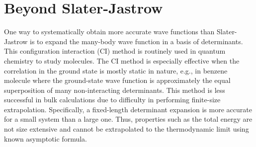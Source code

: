 \begin{comment}
For the gravitational interaction $v(r)=Gm_1m_2/r^2$, eq.~(\ref{eq:wf-cusp}) implies
\begin{align}
\lim\limits_{r\rightarrow 0} u(r) = \alpha\ln r,
\end{align}
where $\alpha$ satisfies
\begin{align}
\alpha^2 + (2-d)\alpha - G(m_1+m_2) = 0.
\end{align}
\end{comment}







\section{Beyond Slater-Jastrow}
One way to systematically obtain more accurate wave functions than Slater-Jastrow is to expand the many-body wave function in a basis of determinants. This configuration interaction (CI) method is routinely used in quantum chemistry to study molecules. The CI method is especially effective when the correlation in the ground state is mostly static in nature, e.g., in benzene molecule where the ground-state wave function is approximately the equal superposition of many non-interacting determinants. This method is less successful in bulk calculations due to difficulty in performing finite-size extrapolation. Specifically, a fixed-length determinant expansion is more accurate for a small system than a large one. Thus, properties such as the total energy are not size extensive and cannot be extrapolated to the thermodynamic limit using known asymptotic formula.

